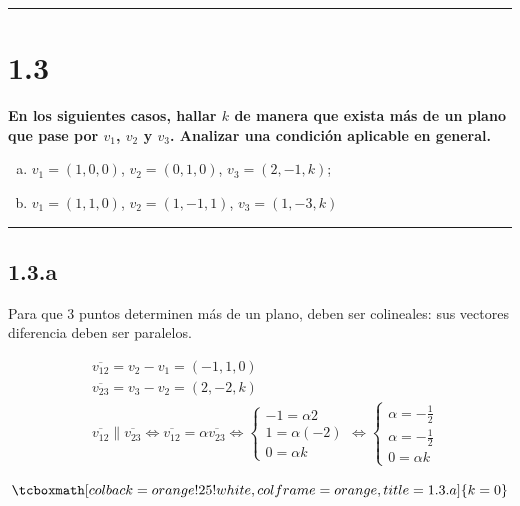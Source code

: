 \documentclass{article}
\begin{document}
\hrule
\vspace{10 pt}

\section*{1.3}
\label{sec:1.3}

\textbf{En los siguientes casos, hallar $k$ de manera que exista más de un plano que pase por $v_1$, $v_2$ y $v_3$. Analizar una condición aplicable en general.} 

\begin{enumerate}[(a)]
\bfseries
\item $v_1 = (1, 0, 0)$, $v_2=(0, 1, 0)$, $v_3 = (2, -1, k)$;

\item $v_1 = (1, 1, 0)$, $v_2=(1, -1, 1)$, $v_3 = (1, -3, k)$
\end{enumerate}
\hrule

\subsection*{1.3.a}
\label{subsec:1.3.a}

Para que 3 puntos determinen más de un plano, deben ser colineales: sus vectores diferencia deben ser paralelos.

\begin{subequations}
\begin{align}
& \overline{v_{12}} = v_2 - v_1 = (-1, 1, 0) \\
& \overline{v_{23}} = v_3 - v_2 = (2, -2, k) \\
& \overline{v_{12}} \parallel \overline{v_{23}} \Leftrightarrow \overline{v_{12}} = \alpha \overline{v_{23}} \Leftrightarrow \left\{ \begin{array}{ll}
-1 = \alpha 2 \\
1 = \alpha (-2) \\
0 = \alpha k
\end{array} \right. \Leftrightarrow \left\{ \begin{array}{ll}
\alpha = -\frac{1}{2} \\
\alpha = -\frac{1}{2} \\
0 = \alpha k
\end{array} \right.
\end{align}
\end{subequations}

\begin{equation}
\tcboxmath[colback=orange!25!white,colframe=orange,title=1.3.a]
{ k = 0 }
\end{equation}
\end{document}
